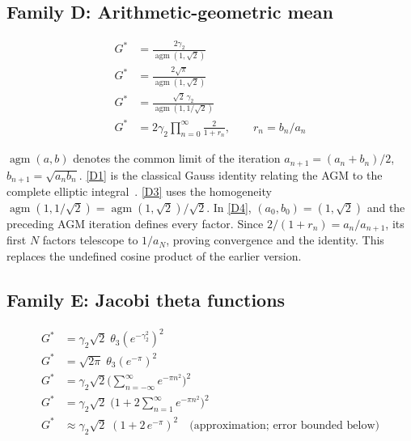 \documentclass[12pt,reqno]{amsart}
\theoremstyle{definition}
\theoremstyle{remark}
\newcommand{\Gstar}{G^{\!*}}
\newcommand{\agm}{\operatorname{agm}}
\begin{document}
\subsection{Family D: Arithmetic-geometric mean}\label{sec:D}

\begin{align}
  {\Gstar} &= \frac{2\gamma_{2}}{\agm(1,\sqrt{2})}
    \tag{D1}\label{D1}\\[5pt]
  {\Gstar} &= \frac{2\sqrt{\pi}}{\agm(1,\sqrt{2})}
    \tag{D2}\label{D2}\\[5pt]
  {\Gstar} &= \frac{\sqrt{2}\,\gamma_{2}}{\agm(1,1/\!\sqrt{2})}
    \tag{D3}\label{D3}\\[5pt]
  {\Gstar} &= 2\gamma_{2}\prod_{n=0}^{\infty}\frac{2}{1+r_n},
    \qquad r_n=b_n/a_n
    \tag{D4}\label{D4}
\end{align}

\noindent
$\agm(a,b)$ denotes the common limit of the iteration
$a_{n+1}=(a_{n}+b_{n})/2$, $b_{n+1}=\sqrt{a_{n}b_{n}}$.
\eqref{D1} is the classical Gauss identity relating the AGM to
the complete elliptic integral~\cite{BorweinBorwein}.
\eqref{D3} uses the homogeneity $\agm(1,1/\!\sqrt{2})=\agm(1,\sqrt{2})/\sqrt{2}$.
In \eqref{D4}, $(a_0,b_0)=(1,\sqrt2)$ and the preceding AGM iteration
defines every factor. Since $2/(1+r_n)=a_n/a_{n+1}$, its first $N$
factors telescope to $1/a_N$, proving convergence and the identity.
This replaces the undefined cosine product of the earlier version.

\subsection{Family E: Jacobi theta functions}\label{sec:E}

\begin{align}
  {\Gstar} &= \gamma_{2}\sqrt{2}\;\theta_{3}(e^{-\gamma_{2}^{2}})^{2}
    \tag{E1}\label{E1}\\[5pt]
  {\Gstar} &= \sqrt{2\pi}\;\theta_{3}(e^{-\pi})^{2}
    \tag{E2}\label{E2}\\[5pt]
  {\Gstar} &= \gamma_{2}\sqrt{2}
    \biggl(\sum_{n=-\infty}^{\infty}e^{-\pi n^{2}}\biggr)^{\!2}
    \tag{E3}\label{E3}\\[5pt]
  {\Gstar} &= \gamma_{2}\sqrt{2}\;
    \biggl(1 + 2\sum_{n=1}^{\infty}e^{-\pi n^{2}}\biggr)^{\!2}
    \tag{E4}\label{E4}\\[5pt]
  {\Gstar} &\approx \gamma_{2}\sqrt{2}\;
    (1 + 2\,e^{-\pi})^{2}
    \quad\text{(approximation; error bounded below)}
    \tag{E5}\label{E5}
\end{align}
\end{document}

